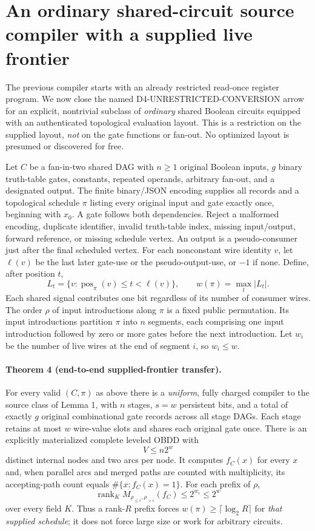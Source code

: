 \documentclass[11pt]{article}
\begin{document}
\section{An ordinary shared-circuit source compiler with a supplied live frontier}
The previous compiler starts with an already restricted read-once register program. We now close the named D4-UNRESTRICTED-CONVERSION arrow for an explicit, nontrivial subclass of \emph{ordinary} shared Boolean circuits equipped with an authenticated topological evaluation layout. This is a restriction on the supplied layout, \emph{not} on the gate functions or fan-out. No optimized layout is presumed or discovered for free.

Let $C$ be a fan-in-two shared DAG with $n\geq1$ original Boolean inputs, $g$ binary truth-table gates, constants, repeated operands, arbitrary fan-out, and a designated output. The finite binary/JSON encoding supplies all records and a topological schedule $\pi$ listing every original input and gate exactly once, beginning with $x_0$. A gate follows both dependencies. Reject a malformed encoding, duplicate identifier, invalid truth-table index, missing input/output, forward reference, or missing schedule vertex. An output is a pseudo-consumer just after the final scheduled vertex. For each nonconstant wire identity $v$, let $\ell(v)$ be the last later gate-use or the pseudo-output-use, or $-1$ if none. Define, after position $t$,
\[
L_t=\{v:\operatorname{pos}_{\pi}(v)\le t<\ell(v)\},\qquad
w(\pi)=\max_t |L_t|.
\]
Each shared signal contributes one bit regardless of its number of consumer wires. The order $\rho$ of input introductions along $\pi$ is a fixed public permutation. Its input introductions partition $\pi$ into $n$ segments, each comprising one input introduction followed by zero or more gates before the next introduction. Let $w_i$ be the number of live wires at the end of segment $i$, so $w_i\le w$.

\paragraph{Theorem 4 (end-to-end supplied-frontier transfer).}
For every valid $(C,\pi)$ as above there is a \emph{uniform}, fully charged compiler to the source class of Lemma 1, with $n$ stages, $s=w$ persistent bits, and a total of exactly $g$ original combinational gate records across all stage DAGs. Each stage retains at most $w$ wire-value slots and shares each original gate once. There is an explicitly materialized complete leveled OBDD with
\[
V\le n2^w
\]
distinct internal nodes and two arcs per node. It computes $f_C(x)$ for every $x$ and, when parallel arcs and merged paths are counted with multiplicity, its accepting-path count equals $\#\{x:f_C(x)=1\}$. For each prefix of $\rho$,
\[
\operatorname{rank}_K M_{\rho_{\le i},\rho_{>i}}(f_C)
\le 2^{w_i}\le2^w
\]
over every field $K$. Thus a rank-$R$ prefix forces $w(\pi)\ge\lceil\log_2R\rceil$ for \emph{that supplied schedule}; it does not force large size or work for arbitrary circuits.
\end{document}
